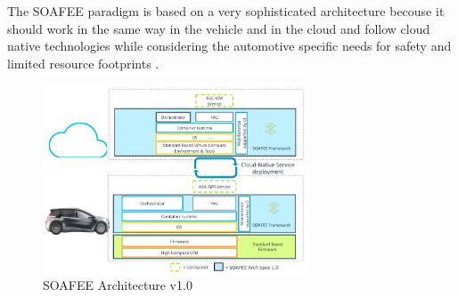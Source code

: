 The SOAFEE paradigm is based on a very sophisticated architecture becouse it should work in the same way in the vehicle and in the cloud and follow cloud native technologies while considering the automotive specific needs for safety and limited resource footprints \cite{SoafeeArchitecture}.
\begin{figure}[h]  %
    \centering
    \includegraphics[width=0.7\textwidth]{images/SOAFEE_architecture.png}  %
    \caption{SOAFEE Architecture v1.0 \cite{SoafeeArchitecture}}
    \label{fig:SoafeeArchitecture}
\end{figure}